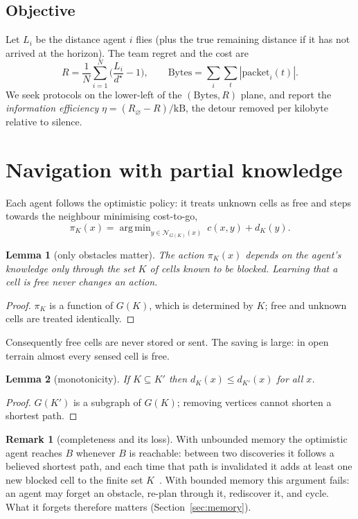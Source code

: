 \documentclass[11pt,a4paper]{article}
\newtheorem{lemma}{Lemma}
\theoremstyle{definition}
\newtheorem{remark}{Remark}
\DeclareMathOperator*{\argmin}{arg\,min}
\begin{document}
\subsection{Objective}
Let $L_i$ be the distance agent $i$ flies (plus the true remaining distance if it has not arrived at the horizon). The team regret and the cost are
\[
R=\frac1N\sum_{i=1}^N\Big(\frac{L_i}{d^\star}-1\Big),\qquad \mathrm{Bytes}=\sum_i\sum_t|\text{packet}_i(t)|.
\]
We seek protocols on the lower-left of the $(\mathrm{Bytes},R)$ plane, and report the \emph{information efficiency} $\eta=(R_\varnothing-R)/\mathrm{kB}$, the detour removed per kilobyte relative to silence.

\section{Navigation with partial knowledge}\label{sec:nav}

Each agent follows the optimistic policy: it treats unknown cells as free and steps towards the neighbour minimising cost-to-go,
\[
\pi_K(x)=\argmin_{y\in\mathcal N_{G(K)}(x)}\ c(x,y)+d_K(y).
\]

\begin{lemma}[only obstacles matter]\label{lem:blocked}
The action $\pi_K(x)$ depends on the agent's knowledge only through the set $K$ of cells known to be blocked. Learning that a cell is free never changes an action.
\end{lemma}
\begin{proof}
$\pi_K$ is a function of $G(K)$, which is determined by $K$; free and unknown cells are treated identically.
\end{proof}
Consequently free cells are never stored or sent. The saving is large: in open terrain almost every sensed cell is free.

\begin{lemma}[monotonicity]\label{lem:mono}
If $K\subseteq K'$ then $d_K(x)\le d_{K'}(x)$ for all $x$.
\end{lemma}
\begin{proof}
$G(K')$ is a subgraph of $G(K)$; removing vertices cannot shorten a shortest path.
\end{proof}

\begin{remark}[completeness and its loss]
With unbounded memory the optimistic agent reaches $B$ whenever $B$ is reachable: between two discoveries it follows a believed shortest path, and each time that path is invalidated it adds at least one new blocked cell to the finite set $K$~\cite{stentz94,koenig02}. With bounded memory this argument fails: an agent may forget an obstacle, re-plan through it, rediscover it, and cycle. What it forgets therefore matters (Section~\ref{sec:memory}).
\end{remark}
\end{document}
